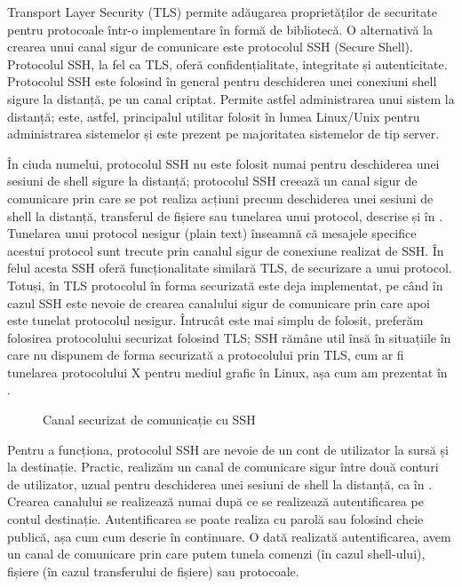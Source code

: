 Transport Layer Security (TLS) permite adăugarea proprietăților de securitate pentru protocoale într-o implementare în formă de bibliotecă. O alternativă la crearea unui canal sigur de comunicare este protocolul SSH (Secure Shell). Protocolul SSH, la fel ca TLS, oferă confidențialitate, integritate și autenticitate. Protocolul SSH este folosind în general pentru deschiderea unei conexiuni shell sigure la distanță, pe un canal criptat. Permite astfel administrarea unui sistem la distanță; este, astfel, principalul utilitar folosit în lumea Linux/Unix pentru administrarea sistemelor și este prezent pe majoritatea sistemelor de tip server.

În ciuda numelui, protocolul SSH nu este folosit numai pentru deschiderea unei sesiuni de shell sigure la distanță; protocolul SSH creează un canal sigur de comunicare prin care se pot realiza acțiuni precum deschiderea unei sesiuni de shell la distanță, transferul de fișiere sau tunelarea unui protocol, descrise și în . Tunelarea unui protocol nesigur (plain text) înseamnă că mesajele specifice acestui protocol sunt trecute prin canalul sigur de conexiune realizat de SSH. În felul acesta SSH oferă funcționalitate similară TLS, de securizare a unui protocol. Totuși, în TLS protocolul în forma securizată este deja implementat, pe când în cazul SSH este nevoie de crearea canalului sigur de comunicare prin care apoi este tunelat protocolul nesigur. Întrucât este mai simplu de folosit, preferăm folosirea protocolului securizat folosind TLS; SSH rămâne util însă în situațiile în care nu dispunem de forma securizată a protocolului prin TLS, cum ar fi tunelarea protocolului X pentru mediul grafic în Linux, așa cum am prezentat în .

\begin{figure}[htbp]
  \centering
  \def\svgwidth{\columnwidth}
  
  \caption{Canal securizat de comunicație cu SSH}
  \label{fig:sec:ssh-channel}
\end{figure}

Pentru a funcționa, protocolul SSH are nevoie de un cont de utilizator la sursă și la destinație. Practic, realizăm un canal de comunicare sigur între două conturi de utilizator, uzual pentru deschiderea unei sesiuni de shell la distanță, ca în . Crearea canalului se realizează numai după ce se realizează autentificarea pe contul destinație. Autentificarea se poate realiza cu parolă sau folosind cheie publică, așa cum cum descrie în continuare. O dată realizată autentificarea, avem un canal de comunicare prin care putem tunela comenzi (în cazul shell-ului), fișiere (în cazul transferului de fișiere) sau protocoale.

